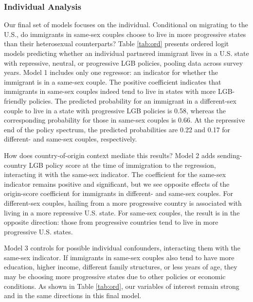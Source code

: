 \documentclass[
  11pt,
]{article}
\begin{document}
\hypertarget{individual-analysis}{%
\subsubsection{Individual Analysis}\label{individual-analysis}}

Our final set of models focuses on the individual. Conditional on migrating to the U.S., do immigrants in same-sex couples choose to live in more progressive states than their heterosexual counterparts? Table \ref{tab:ord} presents ordered logit models predicting whether an individual partnered immigrant lives in a U.S. state with repressive, neutral, or progressive LGB policies, pooling data across survey years. Model 1 includes only one regressor: an indicator for whether the immigrant is in a same-sex couple. The positive coefficient indicates that immigrants in same-sex couples indeed tend to live in states with more LGB-friendly policies. The predicted probability for an immigrant in a different-sex couple to live in a state with progressive LGB policies is 0.58, whereas the corresponding probability for those in same-sex couples is 0.66. At the repressive end of the policy spectrum, the predicted probabilities are 0.22 and 0.17 for different- and same-sex couples, respectively.

How does country-of-origin context mediate this results? Model 2 adds sending-country LGB policy score at the time of immigration to the regression, interacting it with the same-sex indicator. The coefficient for the same-sex indicator remains positive and significant, but we see opposite effects of the origin-score coefficient for immigrants in different- and same-sex couples. For different-sex couples, hailing from a more progressive country is associated with living in a more repressive U.S. state. For same-sex couples, the result is in the opposite direction: those from progressive countries tend to live in more progressive U.S. states.

Model 3 controls for possible individual confounders, interacting them with the same-sex indicator. If immigrants in same-sex couples also tend to have more education, higher income, different family structures, or less years of age, they may be choosing more progressive states due to other policies or economic conditions. As shown in Table \ref{tab:ord}, our variables of interest remain strong and in the same directions in this final model.
\end{document}
